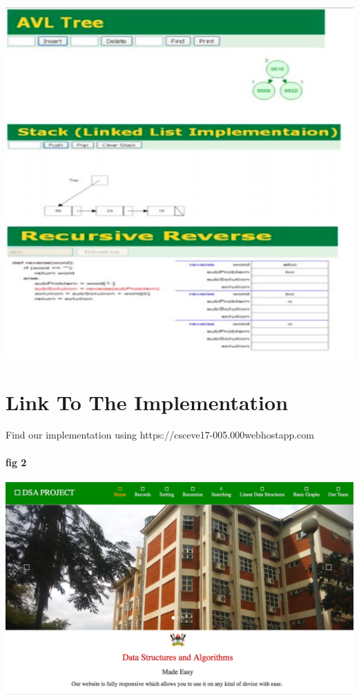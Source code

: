 \documentclass{article}
\begin{document}
\includegraphics[width=1.0\textwidth]{./sample}\\[0.1in]






\section{Link To The Implementation}
Find our implementation using https://csceve17-005.000webhostapp.com
\paragraph{fig 2}

\includegraphics[width=1.0\textwidth]{./site}\\[0.1in]
\end{document}
